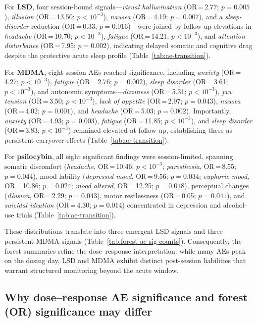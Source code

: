 For \textbf{LSD}, four session-bound signals---\textit{visual hallucination} (OR\,=\,2.77; $p=0.005$), \textit{illusion} (OR\,=\,13.50; $p<10^{-3}$), \textit{nausea} (OR\,=\,4.19; $p=0.007$), and a \textit{sleep-disorder} reduction (OR\,=\,0.33; $p=0.016$)---were joined by follow-up elevations in \textit{headache} (OR\,=\,10.70; $p<10^{-3}$), \textit{fatigue} (OR\,=\,14.21; $p<10^{-3}$), and \textit{attention disturbance} (OR\,=\,7.95; $p=0.002$), indicating delayed somatic and cognitive drag despite the protective acute sleep profile (Table~\ref{tab:ae-transition}).

For \textbf{MDMA}, eight session AEs reached significance, including \textit{anxiety} (OR\,=\,4.27; $p<10^{-3}$), \textit{fatigue} (OR\,=\,2.76; $p=0.002$), \textit{sleep disorder} (OR\,=\,3.61; $p<10^{-3}$), and autonomic symptoms---\textit{dizziness} (OR\,=\,5.31; $p<10^{-3}$), \textit{jaw tension} (OR\,=\,3.50; $p<10^{-3}$), \textit{lack of appetite} (OR\,=\,2.97; $p=0.043$), \textit{nausea} (OR\,=\,4.02; $p=0.001$), and \textit{headache} (OR\,=\,5.03; $p=0.002$).
Importantly, \textit{anxiety} (OR\,=\,4.93; $p=0.003$), \textit{fatigue} (OR\,=\,11.85; $p<10^{-3}$), and \textit{sleep disorder} (OR\,=\,3.83; $p<10^{-3}$) remained elevated at follow-up, establishing these as persistent carryover effects (Table~\ref{tab:ae-transition}).

For \textbf{psilocybin}, all eight significant findings were session-limited, spanning somatic discomfort (\textit{headache}, OR\,=\,10.46; $p<10^{-3}$; \textit{paresthesia}, OR\,=\,8.55; $p=0.044$), mood lability (\textit{depressed mood}, OR\,=\,9.56; $p=0.034$; \textit{euphoric mood}, OR\,=\,10.86; $p=0.024$; \textit{mood altered}, OR\,=\,12.25; $p=0.018$), perceptual changes (\textit{illusion}, OR\,=\,2.29; $p=0.043$), motor restlessness (OR\,=\,0.05; $p=0.041$), and \textit{suicidal ideation} (OR\,=\,4.30; $p=0.014$) concentrated in depression and alcohol-use trials (Table~\ref{tab:ae-transition}).

These distributions translate into three emergent LSD signals and three persistent MDMA signals (Table~\ref{tab:forest-ae-sig-counts}).
Consequently, the forest summaries refine the dose–response interpretation: while many AEs peak on the dosing day, LSD and MDMA exhibit distinct post-session liabilities that warrant structured monitoring beyond the acute window.




\subsection{Why dose–response AE significance and forest (OR) significance may differ}

